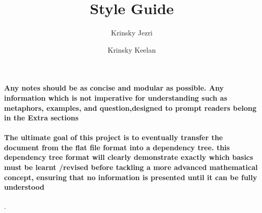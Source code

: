 \documentclass{article}
\author{Krinsky Jezri \and Krinsky Keelan}
\title{Style Guide}
\begin{document}
\maketitle
\paragraph{Any notes should be as concise and modular as possible. 
Any information which is not imperative for understanding such as metaphors, examples, and question,designed to prompt readers belong in the Extra sections}

\paragraph{The ultimate goal of this project is to eventually transfer the document from the flat file format into a dependency tree. this dependency tree format will clearly demonstrate exactly which basics must be learnt /revised before tackling a more advanced mathematical concept, ensuring that no information is presented until it can be fully understood } . 
\end{document}
